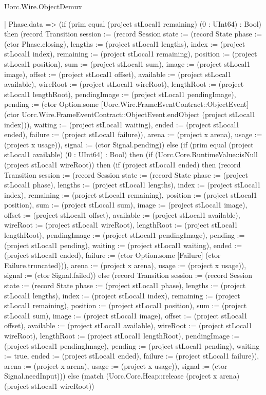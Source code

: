 \begin{lexlean}{Uorc.Wire.ObjectDemux}
\begin{semanticmodule}
{        | Phase.data => (if (prim equal (project stLocal1 remaining) (0 : UInt64) : Bool) then (record Transition {session := (record Session {state := (record State {phase := (ctor Phase.closing), lengths := (project stLocal1 lengths), index := (project stLocal1 index), remaining := (project stLocal1 remaining), position := (project stLocal1 position), sum := (project stLocal1 sum), image := (project stLocal1 image), offset := (project stLocal1 offset), available := (project stLocal1 available), wireRoot := (project stLocal1 wireRoot), lengthRoot := (project stLocal1 lengthRoot), pendingImage := (project stLocal1 pendingImage), pending := (ctor Option.some [Uorc.Wire.FrameEventContract::ObjectEvent] (ctor Uorc.Wire.FrameEventContract::ObjectEvent.endObject (project stLocal1 index))), waiting := (project stLocal1 waiting), ended := (project stLocal1 ended), failure := (project stLocal1 failure)}), arena := (project x arena), usage := (project x usage)}), signal := (ctor Signal.pending)}) else (if (prim equal (project stLocal1 available) (0 : UInt64) : Bool) then (if (Uorc.Core.RuntimeValue::isNull (project stLocal1 wireRoot)) then (if (project stLocal1 ended) then (record Transition {session := (record Session {state := (record State {phase := (project stLocal1 phase), lengths := (project stLocal1 lengths), index := (project stLocal1 index), remaining := (project stLocal1 remaining), position := (project stLocal1 position), sum := (project stLocal1 sum), image := (project stLocal1 image), offset := (project stLocal1 offset), available := (project stLocal1 available), wireRoot := (project stLocal1 wireRoot), lengthRoot := (project stLocal1 lengthRoot), pendingImage := (project stLocal1 pendingImage), pending := (project stLocal1 pending), waiting := (project stLocal1 waiting), ended := (project stLocal1 ended), failure := (ctor Option.some [Failure] (ctor Failure.truncated))}), arena := (project x arena), usage := (project x usage)}), signal := (ctor Signal.failed)}) else (record Transition {session := (record Session {state := (record State {phase := (project stLocal1 phase), lengths := (project stLocal1 lengths), index := (project stLocal1 index), remaining := (project stLocal1 remaining), position := (project stLocal1 position), sum := (project stLocal1 sum), image := (project stLocal1 image), offset := (project stLocal1 offset), available := (project stLocal1 available), wireRoot := (project stLocal1 wireRoot), lengthRoot := (project stLocal1 lengthRoot), pendingImage := (project stLocal1 pendingImage), pending := (project stLocal1 pending), waiting := true, ended := (project stLocal1 ended), failure := (project stLocal1 failure)}), arena := (project x arena), usage := (project x usage)}), signal := (ctor Signal.needInput)})) else (match (Uorc.Core.Heap::release (project x arena) (project stLocal1 wireRoot))
}
\end{semanticmodule}
\end{lexlean}
